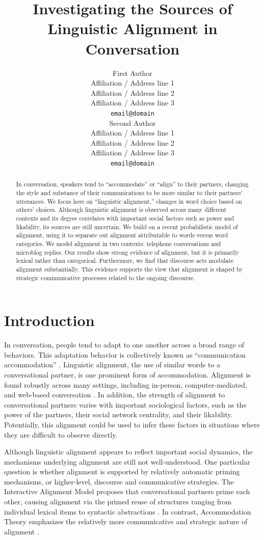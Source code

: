 \documentclass[11pt]{article}
\title{Investigating the Sources of Linguistic Alignment in Conversation}
\author{First Author \\
  Affiliation / Address line 1 \\
  Affiliation / Address line 2 \\
  Affiliation / Address line 3 \\
  {\tt email@domain} \\\And
  Second Author \\
  Affiliation / Address line 1 \\
  Affiliation / Address line 2 \\
  Affiliation / Address line 3 \\
  {\tt email@domain} \\}
\date{}
\begin{document}
\maketitle

\begin{abstract}
In conversation, speakers tend to ``accommodate'' or ``align'' to their partners, changing the style and substance of their communications to be more similar to their partners' utterances. We focus here on ``linguistic alignment,'' changes in word choice based on others' choices. Although linguistic alignment is observed across many different contexts and its degree correlates with important social factors such as power and likability, its sources are still uncertain.
We build on a recent probabilistic model of alignment, using it to separate out alignment attributable to words versus word categories. We model alignment in two contexts: telephone conversations and microblog replies.
Our results show strong evidence of alignment, but it is primarily lexical rather than categorical. Furthermore, we find that discourse acts modulate alignment substantially. This evidence supports the view that alignment is shaped by strategic communicative processes related to the ongoing discourse.
\end{abstract}

\section{Introduction}

In conversation, people tend to adapt to one another across a broad range of behaviors. This adaptation behavior is collectively known as ``communication accommodation'' \cite{GilesCouplandCoupland1991}. Linguistic alignment, the use of similar words to a conversational partner, is one prominent form of accommodation. Alignment is found robustly across many settings, including in-person, computer-mediated, and web-based conversation \cite{DNMEtAl2012,GilesSchererTaylor1979,NiederhofferPennebaker2002}. In addition, the strength of alignment to conversational partners varies with important sociological factors, such as the power of the partners, their social network centrality, and their likability. Potentially, this alignment could be used to infer these factors in situations where they are difficult to observe directly.

Although linguistic alignment appears to reflect important social dynamics, the mechanisms underlying alignment are still not well-understood. One particular question is whether alignment is supported by relatively automatic priming mechanisms, or higher-level, discourse and communicative strategies. The Interactive Alignment Model proposes that conversational partners prime each other, causing alignment via the primed reuse of structures ranging from individual lexical items to syntactic abstractions  \cite{PickeringGarrod2004}. In contrast, Accommodation Theory emphasizes the relatively more communicative and strategic nature of alignment \cite{GilesCouplandCoupland1991}.
\end{document}
